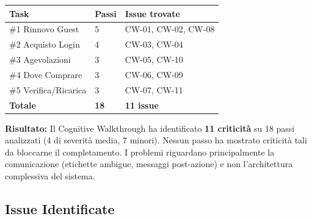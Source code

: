 \begin{tcolorbox}[colback=backgroundColor,colframe=primaryColor,arc=2mm]
\small

\renewcommand{\arraystretch}{1.3}
\begin{tabular}{|L{3.5cm}|C{1.5cm}|C{3cm}|}
\hline
\textbf{Task} & \textbf{Passi} & \textbf{Issue trovate} \\
\hline
\#1 Rinnovo Guest & 5 & CW-01, CW-02, CW-08 \\
\hline
\#2 Acquisto Login & 4 & CW-03, CW-04 \\
\hline
\#3 Agevolazioni & 3 & CW-05, CW-10 \\
\hline
\#4 Dove Comprare & 3 & CW-06, CW-09 \\
\hline
\#5 Verifica/Ricarica & 3 & CW-07, CW-11 \\
\hline
{}
\textbf{Totale} & \textbf{18} & \textbf{11 issue} \\
\hline
\end{tabular}

\vspace{0.3cm}
\noindent\textbf{Risultato:} Il Cognitive Walkthrough ha identificato \textbf{11 criticit\`a} su 18 passi analizzati (4 di severit\`a media, 7 minori). Nessun passo ha mostrato criticit\`a tali da bloccarne il completamento. I problemi riguardano principalmente la comunicazione (etichette ambigue, messaggi post-azione) e non l'architettura complessiva del sistema.

\end{tcolorbox}

\vspace{0.3cm}

\subsection{Issue Identificate}

